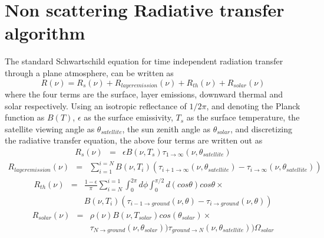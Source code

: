 \documentclass[11pt]{article}
\begin{document}
\section{Non scattering Radiative transfer algorithm}

The standard Schwartschild equation for time independent radiation
transfer through a plane atmosphere, can be written as
\cite{goo:89,edw:92}
\begin{equation}
R(\nu) = R_{s}(\nu) + R_{layer emission}(\nu) + R_{th}(\nu) + R_{solar}(\nu)
\end{equation}
where the four terms are the surface, layer emissions, downward
thermal and solar respectively. Using an isotropic reflectance of
$1/2\pi$, and denoting the Planck function as $B(T)$, $\epsilon$ as
the surface emissivity, $T_{s}$ as the surface temperature, the
satellite viewing angle as $\theta_{satellite}$, the sun zenith angle
as $\theta_{solar}$, and discretizing the radiative transfer equation,
the above four terms are written out as
\begin{eqnarray*}
R_{s}(\nu) & = & \epsilon B(\nu,T_{s})
\tau_{1 \rightarrow \infty}(\nu,\theta_{satellite})
\end{eqnarray*}
\begin{eqnarray*}
R_{layer emission}(\nu) & = & \sum_{i=1}^{i=N} B(\nu,T_{i})
(\tau_{i+1 \rightarrow \infty}(\nu,\theta_{satellite})-
 \tau_{i \rightarrow \infty}(\nu,\theta_{satellite}))
\end{eqnarray*}
\begin{eqnarray*}
R_{th}(\nu) & = & \frac{1 - \epsilon}{\pi} \sum_{i=N}^{i=1} 
\int_{0}^{2\pi}d\phi 
\int_{0}^{\pi/2} d(cos\theta) cos\theta \times \\ 
& & B(\nu,T_{i})(\tau_{i-1 \rightarrow ground}(\nu,\theta)-
 \tau_{i \rightarrow ground}(\nu,\theta))
\end{eqnarray*}
\begin{eqnarray*}
R_{solar}(\nu) & = & \rho(\nu)
B(\nu,T_{solar})cos(\theta_{solar}) \times \\
& &                 \tau_{N \rightarrow ground}(\nu,\theta_{solar}))
                 \tau_{ground \rightarrow N}(\nu,\theta_{satellite}))
                 \Omega_{solar}
\end{eqnarray*}
\end{document}
